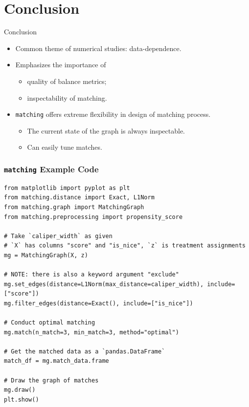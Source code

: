 \documentclass[11pt, compress]{beamer}
\begin{document}
\section{Conclusion}
\begin{frame}{Conclusion}
	\begin{itemize}
		\item Common theme of numerical studies: data-dependence.
		\item Emphasizes the importance of
			\begin{itemize}
				\item quality of balance metrics;
				\item inspectability of matching.
			\end{itemize}
		\item \texttt{matching} offers extreme flexibility in design of matching process.
			\begin{itemize}
				\item The current state of the graph is always inspectable.
				\item Can easily tune matches.
			\end{itemize}
	\end{itemize}
\end{frame}


\begin{frame}[fragile]
\frametitle{\texttt{matching} Example Code}
\begin{verbatim}
from matplotlib import pyplot as plt
from matching.distance import Exact, L1Norm
from matching.graph import MatchingGraph
from matching.preprocessing import propensity_score

# Take `caliper_width` as given
# `X` has columns "score" and "is_nice", `z` is treatment assignments
mg = MatchingGraph(X, z)

# NOTE: there is also a keyword argument "exclude"
mg.set_edges(distance=L1Norm(max_distance=caliper_width), include=["score"])
mg.filter_edges(distance=Exact(), include=["is_nice"])

# Conduct optimal matching
mg.match(n_match=3, min_match=3, method="optimal")

# Get the matched data as a `pandas.DataFrame`
match_df = mg.match_data.frame

# Draw the graph of matches
mg.draw()
plt.show()
\end{verbatim}
\end{frame}

\end{document}
